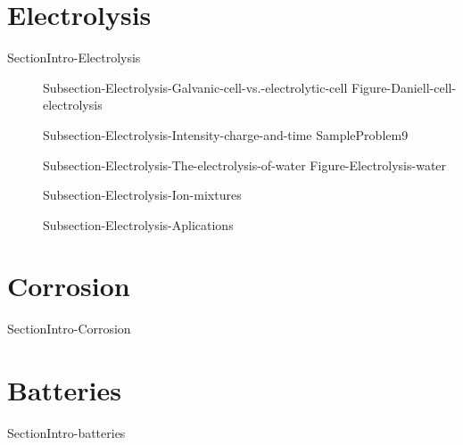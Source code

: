 \documentclass[main.tex]{subfiles}
\newcommand\chapterlabel{Ch-electrochem}\setcounter{figurenewcounter}{0}\setcounter{tablenewcounter}{0}\setcounter{formulanewcounter}{0}\chapterpicture{../{\chapterlabel}/figure1}\chapterpicturelabel{PxFuel}
\begin{document}
 \section{Electrolysis}{SectionIntro-Electrolysis}
\sloppy\begin{description}
    \item[] {Subsection-Electrolysis-Galvanic-cell-vs.-electrolytic-cell}
{Figure-Daniell-cell-electrolysis}
     \item[] {Subsection-Electrolysis-Intensity-charge-and-time}
     {SampleProblem9}
     \item[] {Subsection-Electrolysis-The-electrolysis-of-water}
{Figure-Electrolysis-water}\vspace{3cm}
     \item[] {Subsection-Electrolysis-Ion-mixtures}

     \item[] {Subsection-Electrolysis-Aplications}

\end{description}


 \section{Corrosion}{SectionIntro-Corrosion}
 \section{Batteries}{SectionIntro-batteries}







\checkoddpage\ifoddpage \clearpage\thispagestyle{empty}\mbox{}\clearpage \else  \fi 
\end{document}
